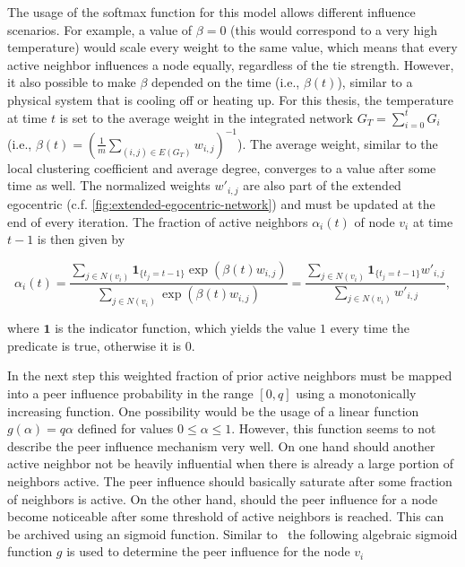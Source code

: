 The usage of the softmax function for this model allows different influence scenarios.
For example, a value of \( \beta = 0 \) (this would correspond to a very high temperature) would scale every weight to the same value, which means that every active neighbor influences a node equally, regardless of the tie strength.
However, it also possible to make \( \beta \) depended on the time (i.e., \( \beta(t) \)), similar to a physical system that is cooling off or heating up.
For this thesis, the temperature at time \( t \) is set to the average weight in the integrated network \( G_{T} = \sum_{i=0}^{t} G_{i}\) (i.e., \( \beta(t) = (\frac{1}{m} \sum_{(i,j) \in E(G_{T})} w_{i,j})^{-1} \)).
The average weight, similar to the local clustering coefficient and average degree, converges to a value after some time as well.
The normalized weights \( w'_{i,j} \) are also part of the extended egocentric (c.f. \cref{fig:extended-egocentric-network}) and must be updated at the end of every iteration.
The fraction of active neighbors \( \alpha_{i}(t) \) of node \(v_{i} \) at time \( t - 1 \) is then given by

\begin{equation}
    \alpha_{i}(t) = \frac{\sum_{j \in N(v_{i})} \mathbf{1}_{\{t_{j} = t-1\}} \exp(\beta(t) w_{i, j})}{\sum_{j \in N(v_{i})} \exp(\beta(t) w_{i, j})} = \frac{\sum_{j \in N(v_{i})} \mathbf{1}_{\{t_{j} = t-1\}} w'_{i, j}}{\sum_{j \in N(v_{i})} w'_{i, j}},
\end{equation}

where \( \mathbf{1} \) is the indicator function, which yields the value \(1\) every time the predicate is true, otherwise it is \(0\).

In the next step this weighted fraction of prior active neighbors must be mapped into a peer influence probability in the range \( [0, q] \) using a monotonically increasing function.
One possibility would be the usage of a linear function \( g(\alpha) = q \alpha \) defined for values \(0 \leq \alpha \leq 1 \).
However, this function seems to not describe the peer influence mechanism very well.
On one hand should another active neighbor not be heavily influential when there is already a large portion of neighbors active.
The peer influence should basically saturate after some fraction of neighbors is active.
On the other hand, should the peer influence for a node become noticeable after some threshold of active neighbors is reached.
This can be archived using an sigmoid function.
Similar to~\cite{Walk2016} the following algebraic sigmoid  function \( g \) is used to determine the peer influence for the node \( v_{i} \)

